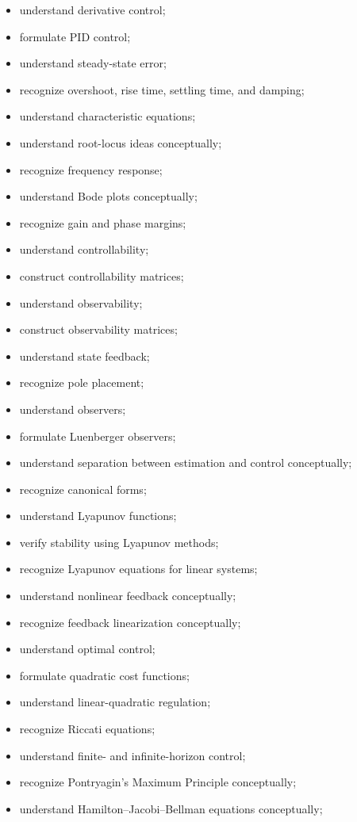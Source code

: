 {\begin{itemize}
    \item understand derivative control;
    \item formulate PID control;
    \item understand steady-state error;
    \item recognize overshoot, rise time, settling time, and damping;
    \item understand characteristic equations;
    \item understand root-locus ideas conceptually;
    \item recognize frequency response;
    \item understand Bode plots conceptually;
    \item recognize gain and phase margins;
    \item understand controllability;
    \item construct controllability matrices;
    \item understand observability;
    \item construct observability matrices;
    \item understand state feedback;
    \item recognize pole placement;
    \item understand observers;
    \item formulate Luenberger observers;
    \item understand separation between estimation and control conceptually;
    \item recognize canonical forms;
    \item understand Lyapunov functions;
    \item verify stability using Lyapunov methods;
    \item recognize Lyapunov equations for linear systems;
    \item understand nonlinear feedback conceptually;
    \item recognize feedback linearization conceptually;
    \item understand optimal control;
    \item formulate quadratic cost functions;
    \item understand linear-quadratic regulation;
    \item recognize Riccati equations;
    \item understand finite- and infinite-horizon control;
    \item recognize Pontryagin's Maximum Principle conceptually;
    \item understand Hamilton--Jacobi--Bellman equations conceptually;

\end{itemize}}
